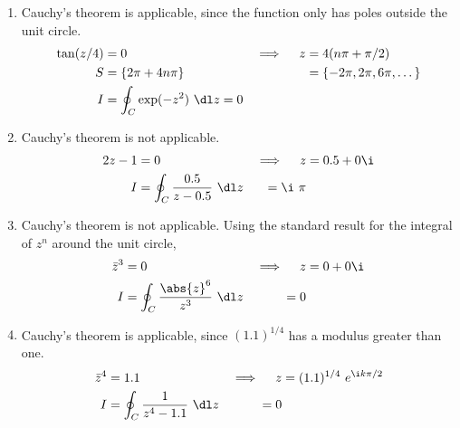 \begin{enumerate}
    \item Cauchy's theorem \textcolor{y_h}{is applicable}, since the function only has
          poles outside the unit circle.
          \begin{align}
              \tan(z/4)        & = 0                               &
              \implies \quad z & = 4(n\pi + \pi/2)                   \\
              S                & = \{2\pi + 4n\pi \}               &
                               & = \{-2\pi, 2\pi, 6\pi,\dots\}       \\
              I                & = \oint_{C} \exp(-z^2)\ \dl z = 0
          \end{align}

    \item Cauchy's theorem \textcolor{y_p}{is not applicable}.
          \begin{align}
              2z - 1           & = 0                                    &
              \implies \quad z & = 0.5 + 0\i                              \\
              I                & = \oint_{C} \frac{0.5}{z - 0.5}\ \dl z
                               & = \i\ \pi
          \end{align}

    \item Cauchy's theorem \textcolor{y_p}{is not applicable}. Using the standard result
          for the integral of $ z^n $ around the unit circle,
          \begin{align}
              \bar{z}^3        & = 0                                      &
              \implies \quad z & = 0 + 0\i                                  \\
              I                & = \oint_{C} \frac{\abs{z}^6}{z^3}\ \dl z
                               & = 0
          \end{align}

    \item Cauchy's theorem \textcolor{y_h}{is applicable}, since $ (1.1)^{1/4} $ has a
          modulus greater than one.
          \begin{align}
              \bar{z}^4        & = 1.1                                   &
              \implies \quad z & = (1.1)^{1/4}\ e^{\i k\pi/2}              \\
              I                & = \oint_{C} \frac{1}{z^4 - 1.1} \ \dl z
                               & = 0
          \end{align}


\end{enumerate}
